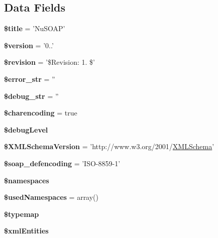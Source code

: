\subsection*{Data Fields}
\begin{DoxyCompactItemize}
\item 
\hypertarget{classnusoap__base_ada57e7bb7c152edad18fe2f166188691}{{\bfseries \$title} = 'Nu\-S\-O\-A\-P'}\label{classnusoap__base_ada57e7bb7c152edad18fe2f166188691}

\item 
\hypertarget{classnusoap__base_a17c8948c68aa44fa9961ae169b6a8961}{{\bfseries \$version} = '0..'}\label{classnusoap__base_a17c8948c68aa44fa9961ae169b6a8961}

\item 
\hypertarget{classnusoap__base_a4ff96b89e7ea5fa55acb086ecb6d0c03}{{\bfseries \$revision} = '\$Revision\-: 1. \$'}\label{classnusoap__base_a4ff96b89e7ea5fa55acb086ecb6d0c03}

\item 
\hypertarget{classnusoap__base_ab9c9e44dc77820490ded7d8bf085cd7e}{{\bfseries \$error\-\_\-str} = ''}\label{classnusoap__base_ab9c9e44dc77820490ded7d8bf085cd7e}

\item 
\hypertarget{classnusoap__base_ad04cbe402f400eb4b0b40f2c03985452}{{\bfseries \$debug\-\_\-str} = ''}\label{classnusoap__base_ad04cbe402f400eb4b0b40f2c03985452}

\item 
\hypertarget{classnusoap__base_a6a4d8a570a9e0a89ef63b192fa3942f2}{{\bfseries \$charencoding} = true}\label{classnusoap__base_a6a4d8a570a9e0a89ef63b192fa3942f2}

\item 
\hypertarget{classnusoap__base_a8907cc6f1fc6ed47ef25190cb8310f41}{{\bfseries \$debug\-Level}}\label{classnusoap__base_a8907cc6f1fc6ed47ef25190cb8310f41}

\item 
\hypertarget{classnusoap__base_a170fda624f458ce4f4b29e496ebfce4c}{{\bfseries \$\-X\-M\-L\-Schema\-Version} = 'http\-://www.\-w3.\-org/2001/\hyperlink{class_x_m_l_schema}{X\-M\-L\-Schema}'}\label{classnusoap__base_a170fda624f458ce4f4b29e496ebfce4c}

\item 
\hypertarget{classnusoap__base_a54cf9ddad3b51e54af1bfad78efad09a}{{\bfseries \$soap\-\_\-defencoding} = 'I\-S\-O-\/8859-\/1'}\label{classnusoap__base_a54cf9ddad3b51e54af1bfad78efad09a}

\item 
{\bfseries \$namespaces}
\item 
\hypertarget{classnusoap__base_a2bd7e321e4132fe338d8502a5594aebc}{{\bfseries \$used\-Namespaces} = array()}\label{classnusoap__base_a2bd7e321e4132fe338d8502a5594aebc}

\item 
{\bfseries \$typemap}
\item 
{\bfseries \$xml\-Entities}
\end{DoxyCompactItemize}


